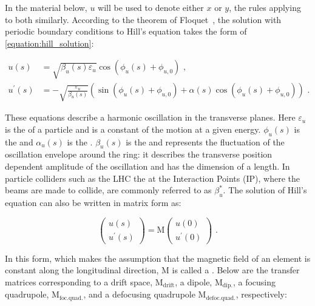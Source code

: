 In the material below, \(u\) will be used to denote either \(x\) or \(y\), the rules applying to both similarly.
According to the theorem of Floquet~\cite{BOOK:Lee:Accelerator_physics}, the solution with periodic boundary conditions to Hill’s equation takes the form of \cref{equation:hill_solution}:

\begin{equation}
    \begin{aligned}
        u(s)          &= \sqrt{\beta_{u}(s) \varepsilon_{u}} \cos \left( \phi_{u}(s) + \phi_{u,0} \right) \text{ ,} \\
        u^{\prime}(s) &= -\sqrt{\frac{\varepsilon_u}{\beta_u(s)}} \left( \sin \left(\phi_u(s) + \phi_{u, 0} \right) + \alpha(s) \cos \left( \phi_u(s)+\phi_{u, 0} \right) \right) \text{ .}
    \end{aligned}
    \label{equation:hill_solution}
\end{equation}

These equations describe a harmonic oscillation in the transverse planes.
Here \(\varepsilon_u\) is the  of a particle and is a constant of the motion at a given energy. 
\(\phi_u(s)\) is the  and \(\alpha_u(s)\) is the .
\(\beta_u(s)\) is the  and represents the fluctuation of the oscillation envelope around the ring: it describes the transverse position dependent amplitude of the oscillation and has the dimension of a length.
In particle colliders such as the LHC the \betafunctions at the Interaction Points (IP), where the beams are made to collide, are commonly referred to as \(\beta_u^{\ast}\).
The solution of Hill's equation can also be written in matrix form as:

\begin{equation}
    \left(
        \begin{array}{c}
            u(s) \\
            u^{\prime}(s)
        \end{array} \right) = \mathrm{M} \left( 
        \begin{array}{c}
            u(0) \\
            u^{\prime}(0)
    \end{array} \right) \text{ .}
    \label{equation:hill_solution_matrix}
\end{equation}

In this form, which makes the assumption that the magnetic field of an element is constant along the longitudinal direction, M is called a . 
Below are the transfer matrices corresponding to a drift space, \(\mathrm{M_{drift}}\), a dipole, \(\mathrm{M_{dip.}}\), a focusing quadrupole, \(\mathrm{M_{foc. quad.}}\), and a defocusing quadrupole \(\mathrm{M_{defoc. quad.}}\), respectively:

